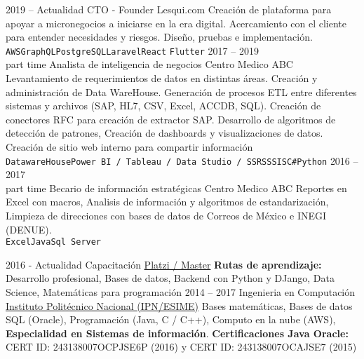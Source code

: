 \documentclass[9pt]{developercv} %
\begin{document}
\begin{entrylist}
	\entry
		{2019 -- Actualidad}
		{CTO - Founder}
		{Lesqui.com}
		{Creación de plataforma para apoyar a micronegocios a iniciarse en la era digital. Acercamiento con el cliente para entender necesidades y riesgos. Diseño, pruebas e implementación. \\ \texttt{AWS}\slashsep\texttt{GraphQL}\slashsep\texttt{PostgreSQL}\slashsep\texttt{Laravel}\slashsep\texttt{React} \slashsep\texttt{Flutter}}
	\entry
		{2017 -- 2019\\\footnotesize{part time}}
		{Analista de inteligencia de negocios}
		{Centro Medico ABC}
		{Levantamiento de requerimientos de datos en distintas áreas. Creación y administración de Data WareHouse. Generación de procesos ETL entre diferentes sistemas y archivos (SAP, HL7, CSV, Excel, ACCDB, SQL). Creación de conectores RFC para creación de extractor SAP. Desarrollo de algoritmos de detección de patrones, Creación de dashboards y visualizaciones de datos. Creación de sitio web interno para compartir información\\ 
			\texttt{DatawareHouse}\slashsep\texttt{Power BI / Tableau / Data Studio / SSRS}\slashsep\texttt{SSIS}\slashsep\texttt{C\#}\slashsep\texttt{Python}}
	\entry
		{2016 -- 2017\\\footnotesize{part time}}
		{Becario de información estratégicas}
		{Centro Medico ABC}
		{Reportes en Excel con macros, Analisis de información y algoritmos de estandarización, Limpieza de direcciones con bases de datos de Correos de México e INEGI (DENUE).\\ 
		\texttt{Excel}\slashsep\texttt{Java}\slashsep\texttt{Sql Server}}
\end{entrylist}



\begin{entrylist}
	\entry
		{2016 - Actualidad}
		{Capacitación}
		{\href{https://platzi.com/@eocode}{Platzi / Master}}
		{\textbf{Rutas de aprendizaje:} Desarrollo profesional, Bases de datos, Backend con Python y DJango, Data Science, Matemáticas para programación}	
	\entry
		{2014 -- 2017}
		{Ingenieria en Computación}
		{\href{https://www.esimecu.ipn.mx/}{Instituto Politécnico Nacional (IPN/ESIME)}}
		{Bases matemáticas, Bases de datos SQL (Oracle), Programación (Java, C / C++), Computo en la nube (AWS), \textbf{Especialidad en Sistemas de información}. \textbf{Certificaciones Java Oracle:} CERT ID: 243138007OCPJSE6P (2016) y CERT ID: 243138007OCAJSE7 (2015) }
		
\end{entrylist}
\end{document}

